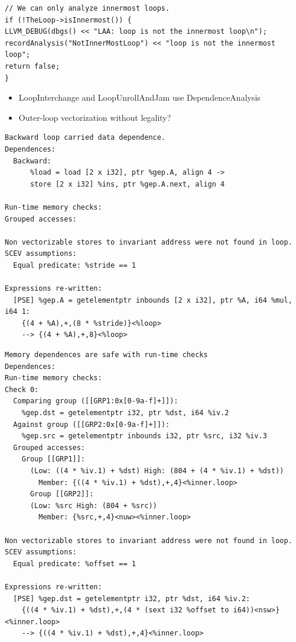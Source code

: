 \documentclass{beamer}
\begin{document}
\begin{frame}[containsverbatim]
  \begin{verbatim}
// We can only analyze innermost loops.
if (!TheLoop->isInnermost()) {
LLVM_DEBUG(dbgs() << "LAA: loop is not the innermost loop\n");
recordAnalysis("NotInnerMostLoop") << "loop is not the innermost loop";
return false;
}
\end{verbatim}
  \vspace{3em}
  \begin{itemize}
    \item LoopInterchange and LoopUnrollAndJam use DependenceAnalysis
    \item Outer-loop vectorization without legality?
  \end{itemize}
\end{frame}

\begin{frame}[containsverbatim]
  \begin{adjustwidth}{-1em}{-1em}
    \begin{verbatim}
Backward loop carried data dependence.
Dependences:
  Backward:
      %load = load [2 x i32], ptr %gep.A, align 4 ->
      store [2 x i32] %ins, ptr %gep.A.next, align 4

Run-time memory checks:
Grouped accesses:

Non vectorizable stores to invariant address were not found in loop.
SCEV assumptions:
  Equal predicate: %stride == 1

Expressions re-written:
  [PSE] %gep.A = getelementptr inbounds [2 x i32], ptr %A, i64 %mul, i64 1:
    {(4 + %A),+,(8 * %stride)}<%loop>
    --> {(4 + %A),+,8}<%loop>
    \end{verbatim}
  \end{adjustwidth}
\end{frame}

\begin{frame}[containsverbatim]
  \begin{adjustwidth}{-1em}{-1em}
    \begin{verbatim}
Memory dependences are safe with run-time checks
Dependences:
Run-time memory checks:
Check 0:
  Comparing group ([[GRP1:0x[0-9a-f]+]]):
    %gep.dst = getelementptr i32, ptr %dst, i64 %iv.2
  Against group ([[GRP2:0x[0-9a-f]+]]):
    %gep.src = getelementptr inbounds i32, ptr %src, i32 %iv.3
  Grouped accesses:
    Group [[GRP1]]:
      (Low: ((4 * %iv.1) + %dst) High: (804 + (4 * %iv.1) + %dst))
        Member: {((4 * %iv.1) + %dst),+,4}<%inner.loop>
      Group [[GRP2]]:
      (Low: %src High: (804 + %src))
        Member: {%src,+,4}<nuw><%inner.loop>

Non vectorizable stores to invariant address were not found in loop.
SCEV assumptions:
  Equal predicate: %offset == 1

Expressions re-written:
  [PSE] %gep.dst = getelementptr i32, ptr %dst, i64 %iv.2:
    {((4 * %iv.1) + %dst),+,(4 * (sext i32 %offset to i64))<nsw>}<%inner.loop>
    --> {((4 * %iv.1) + %dst),+,4}<%inner.loop>
    \end{verbatim}
  \end{adjustwidth}
\end{frame}
\end{document}
